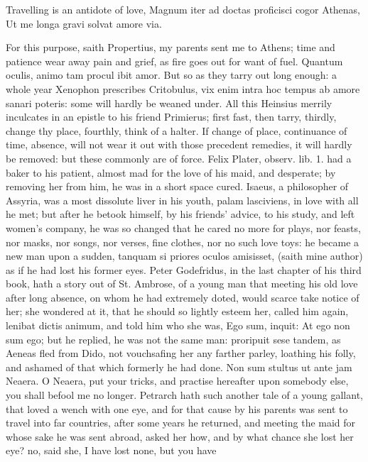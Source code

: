 {Travelling is an antidote of love,
Magnum iter ad doctas proficisci cogor Athenas,
Ut me longa gravi solvat amore via.

For this purpose, saith Propertius, my parents sent me to Athens;
time and patience wear away pain and grief, as fire goes out for want
of fuel. Quantum oculis, animo tam procul ibit amor. But so as they
tarry out long enough: a whole year Xenophon prescribes
Critobulus, vix enim intra hoc tempus ab amore sanari poteris: some
will hardly be weaned under. All this Heinsius merrily inculcates
in an epistle to his friend Primierus; first fast, then tarry, thirdly,
change thy place, fourthly, think of a halter. If change of place,
continuance of time, absence, will not wear it out with those precedent
remedies, it will hardly be removed: but these commonly are of force.
Felix Plater, observ. lib. 1. had a baker to his patient, almost mad
for the love of his maid, and desperate; by removing her from him, he
was in a short space cured. Isaeus, a philosopher of Assyria, was a
most dissolute liver in his youth, palam lasciviens, in love with all
he met; but after he betook himself, by his friends' advice, to his
study, and left women's company, he was so changed that he cared no
more for plays, nor feasts, nor masks, nor songs, nor verses, fine
clothes, nor no such love toys: he became a new man upon a sudden,
tanquam si priores oculos amisisset, (saith mine author) as if he
had lost his former eyes. Peter Godefridus, in the last chapter of his
third book, hath a story out of St. Ambrose, of a young man that
meeting his old love after long absence, on whom he had extremely
doted, would scarce take notice of her; she wondered at it, that he
should so lightly esteem her, called him again, lenibat dictis animum,
and told him who she was, Ego sum, inquit: At ego non sum ego; but he
replied, he was not the same man: proripuit sese tandem, as
Aeneas fled from Dido, not vouchsafing her any farther parley,
loathing his folly, and ashamed of that which formerly he had done.
Non sum stultus ut ante jam Neaera. O Neaera, put your tricks,
and practise hereafter upon somebody else, you shall befool me no
longer. Petrarch hath such another tale of a young gallant, that loved
a wench with one eye, and for that cause by his parents was sent to
travel into far countries, after some years he returned, and meeting
the maid for whose sake he was sent abroad, asked her how, and by what
chance she lost her eye? no, said she, I have lost none, but you have
}
